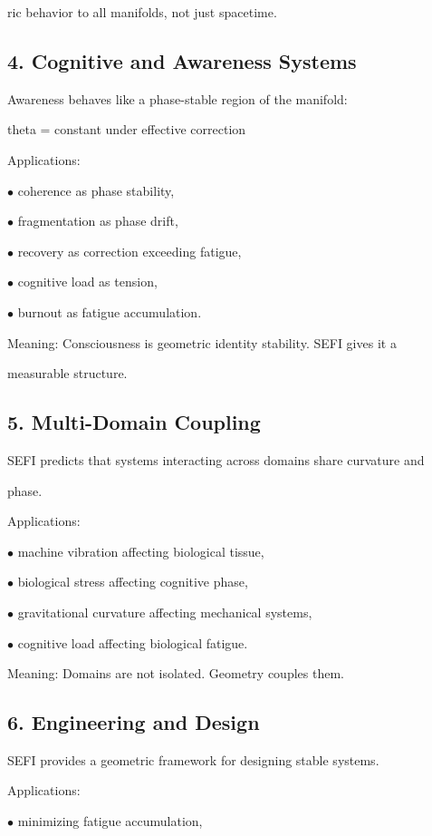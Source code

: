 \documentclass[10pt]{article}
\begin{document}
ric behavior to all manifolds, not just spacetime.

\subsection*{4. Cognitive and Awareness Systems}
Awareness behaves like a phase-stable region of the manifold:

theta = constant under effective correction

Applications:

\noindent $\bullet$ coherence as phase stability,

\noindent $\bullet$ fragmentation as phase drift,

\noindent $\bullet$ recovery as correction exceeding fatigue,


\noindent $\bullet$ cognitive load as tension,

\noindent $\bullet$ burnout as fatigue accumulation.

Meaning: Consciousness is geometric identity stability. SEFI gives it a

measurable structure.

\subsection*{5. Multi-Domain Coupling}
SEFI predicts that systems interacting across domains share curvature and

phase.

Applications:

\noindent $\bullet$ machine vibration affecting biological tissue,

\noindent $\bullet$ biological stress affecting cognitive phase,

\noindent $\bullet$ gravitational curvature affecting mechanical systems,

\noindent $\bullet$ cognitive load affecting biological fatigue.

Meaning: Domains are not isolated. Geometry couples them.

\subsection*{6. Engineering and Design}
SEFI provides a geometric framework for designing stable systems.

Applications:

\noindent $\bullet$ minimizing fatigue accumulation,
\end{document}
